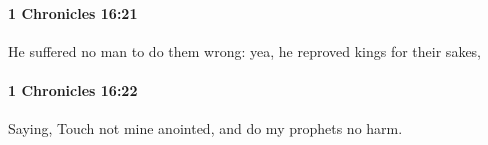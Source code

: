 		\paragraph{1 Chronicles 16:21} %
			\label{1CHRONICLES-16-21}

			He suffered no man to do them wrong: yea, he reproved kings for their sakes,


		\paragraph{1 Chronicles 16:22} %
			\label{1CHRONICLES-16-22}

			Saying, Touch not mine anointed, and do my prophets no harm.


